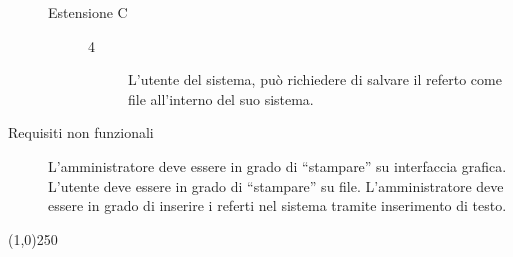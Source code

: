 \begin{description}
\begin{description}
	\item[Estensione C]
	\medskip
	
	\begin{description}
	\item[4]
	L'utente del sistema, può richiedere di salvare il referto come file
	all'interno del suo sistema.
	\end{description}
	
\end{description}



\item[Requisiti non funzionali]
        \begin{itemize}
        \diam L'amministratore deve essere in grado di ``stampare'' su interfaccia grafica.
\diam L'utente deve essere in grado di ``stampare'' su file.
\diam L'amministratore deve essere in grado di inserire i referti nel sistema
	tramite inserimento di testo.
        \end{itemize}
\end{description}

\begin{center}
\line(1,0){250}
\end{center}



